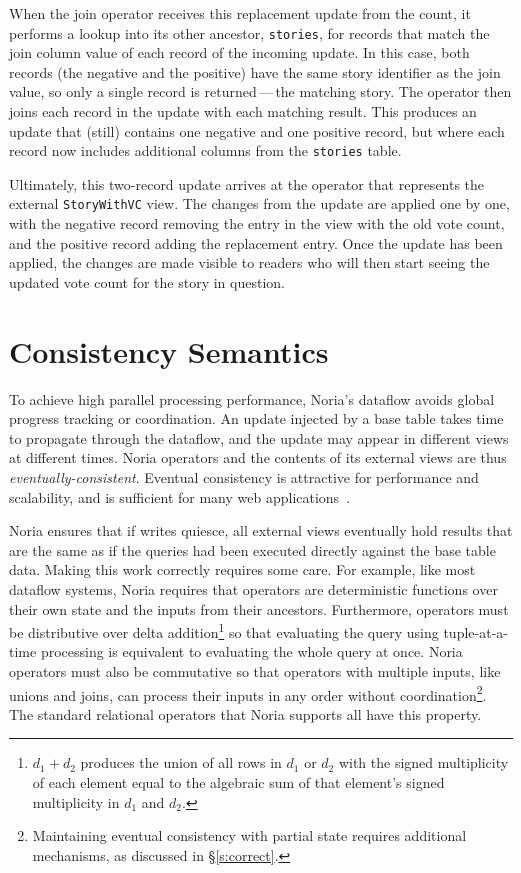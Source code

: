 When the join operator receives this replacement update from the count, it
performs a lookup into its other ancestor, \texttt{stories}, for records that
match the join column value of each record of the incoming update. In this case,
both records (the negative and the positive) have the same story identifier as
the join value, so only a single record is returned\,---\,the matching story.
The operator then joins each record in the update with each matching result.
This produces an update that (still) contains one negative and one positive
record, but where each record now includes additional columns from the
\texttt{stories} table.

Ultimately, this two-record update arrives at the operator that represents the
external \texttt{StoryWithVC} view. The changes from the update are applied one
by one, with the negative record removing the entry in the view with the old
vote count, and the positive record adding the replacement entry. Once the
update has been applied, the changes are made visible to readers who will then
start seeing the updated vote count for the story in question.

\section{Consistency Semantics}
\label{s:noria:consistency}

To achieve high parallel processing performance, Noria's dataflow avoids
global progress tracking or coordination. An update injected by a base table
takes time to propagate through the dataflow, and the update may appear in
different views at different times. Noria operators and the contents of its
external views are thus \emph{eventually-consistent}. Eventual consistency is
attractive for performance and scalability, and is sufficient for many web
applications~\cite{eventually-consistent, facebook-memcache, pnuts}.

Noria ensures that if writes quiesce, all external views eventually hold results
that are the same as if the queries had been executed directly against the base
table data. Making this work correctly requires some care. For example, like
most dataflow systems, Noria requires that operators are deterministic functions
over their own state and the inputs from their ancestors. Furthermore, operators
must be distributive over delta addition\footnote{$d_1 + d_2$ produces the union
of all rows in $d_1$ or $d_2$ with the signed multiplicity of each element equal
to the algebraic sum of that element's signed multiplicity in $d_1$ and $d_2$.}
so that evaluating the query using tuple-at-a-time processing is equivalent to
evaluating the whole query at once. Noria operators must also be commutative so
that operators with multiple inputs, like unions and joins, can process their
inputs in any order without coordination\footnote{Maintaining eventual
consistency with partial state requires additional mechanisms, as discussed in
\S\ref{s:correct}.}. The standard relational operators that Noria supports all
have this property.

